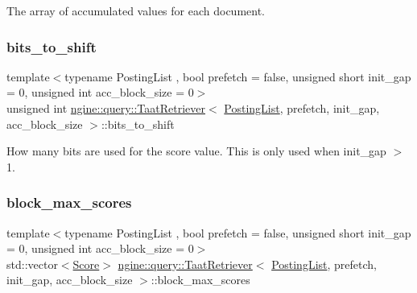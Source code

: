 The array of accumulated values for each document. 

\mbox{\label{classngine_1_1query_1_1TaatRetriever_ace294f37e49fcb504681c94a46917bb1}} 
\subsubsection{\texorpdfstring{bits\+\_\+to\+\_\+shift}{bits\_to\_shift}}
{\footnotesize\ttfamily template$<$typename Posting\+List , bool prefetch = false, unsigned short init\+\_\+gap = 0, unsigned int acc\+\_\+block\+\_\+size = 0$>$ \\
unsigned int \hyperlink{classngine_1_1query_1_1TaatRetriever}{ngine\+::query\+::\+Taat\+Retriever}$<$ \hyperlink{classngine_1_1PostingList}{Posting\+List}, prefetch, init\+\_\+gap, acc\+\_\+block\+\_\+size $>$\+::bits\+\_\+to\+\_\+shift\hspace{0.3cm}{\ttfamily [protected]}}

How many bits are used for the score value. This is only used when init\+\_\+gap $>$ 1. \mbox{\label{classngine_1_1query_1_1TaatRetriever_a63715b843da0889a264365a3379418fa}} 
\subsubsection{\texorpdfstring{block\+\_\+max\+\_\+scores}{block\_max\_scores}}
{\footnotesize\ttfamily template$<$typename Posting\+List , bool prefetch = false, unsigned short init\+\_\+gap = 0, unsigned int acc\+\_\+block\+\_\+size = 0$>$ \\
std\+::vector$<$\hyperlink{structngine_1_1Score}{Score}$>$ \hyperlink{classngine_1_1query_1_1TaatRetriever}{ngine\+::query\+::\+Taat\+Retriever}$<$ \hyperlink{classngine_1_1PostingList}{Posting\+List}, prefetch, init\+\_\+gap, acc\+\_\+block\+\_\+size $>$\+::block\+\_\+max\+\_\+scores\hspace{0.3cm}{\ttfamily [protected]}}

